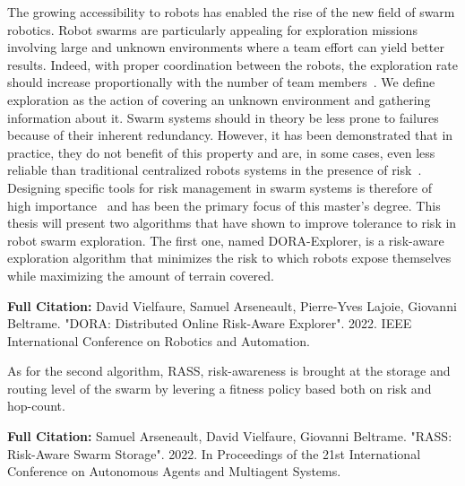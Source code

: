 
\label{sec:Introduction} 
The growing accessibility to robots has enabled the rise of the new field of swarm robotics. Robot swarms are particularly appealing for exploration missions involving large and unknown environments where a team effort can yield better results. Indeed, with proper coordination between the robots, the exploration rate should increase proportionally with the number of team members~\cite{burgard2005coordinated}. We define exploration as the action of covering an unknown environment and gathering information about it. Swarm systems should in theory be less prone to failures because of their inherent redundancy. However, it has been demonstrated that in practice, they do not benefit of this property and are, in some cases, even less reliable than traditional centralized robots systems in the presence of risk~\cite{bjerknes2013fault}. Designing specific tools for risk management in swarm systems is therefore of high importance~\cite{prorok2021beyond} and has been the primary focus of this master's degree. This thesis will
present two algorithms that have shown to improve tolerance to risk in robot swarm exploration. The first one, named \ac{DORA-Explorer}, is a risk-aware exploration
algorithm that minimizes the risk to which robots expose themselves while maximizing the amount of terrain covered. 

\textbf{Full Citation:} David Vielfaure, Samuel Arseneault, Pierre-Yves Lajoie, Giovanni Beltrame. "DORA: Distributed Online Risk-Aware Explorer". 2022.  IEEE International Conference on Robotics and Automation.

As for the second algorithm, \ac{RASS}, risk-awareness is brought at the storage and routing level of the swarm by levering a fitness policy based both on risk and hop-count. 

\textbf{Full Citation:} Samuel Arseneault, David Vielfaure, Giovanni Beltrame. "RASS: Risk-Aware Swarm Storage". 2022. In Proceedings of the 21st International Conference on Autonomous Agents and Multiagent Systems.

